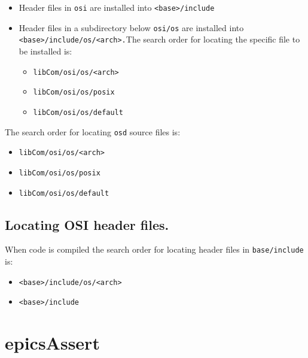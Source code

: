 \begin{itemize}
\item Header files in \verb|osi| are installed into \verb|<base>/include|

\item Header files in a subdirectory below \verb|osi/os| are installed into \verb|<base>/include/os/<arch>.|The search 
order for locating the specific file to be installed is:

\begin{itemize}
 

\item \verb|libCom/osi/os/<arch>|

\item  \verb|libCom/osi/os/posix|

\item  \verb|libCom/osi/os/default|

\end{itemize}

\end{itemize}

The search order for locating \verb|osd| source files is:

\begin{itemize}

\item \verb|libCom/osi/os/<arch>|

\item \verb|libCom/osi/os/posix|

\item \verb|libCom/osi/os/default|

\end{itemize}

\subsection{Locating OSI header files.}

When code is compiled the search order for locating header files in \verb|base/include| is:

\begin{itemize}
\item \verb|<base>/include/os/<arch>|

\item \verb|<base>/include|

\end{itemize}

\section{epicsAssert}

